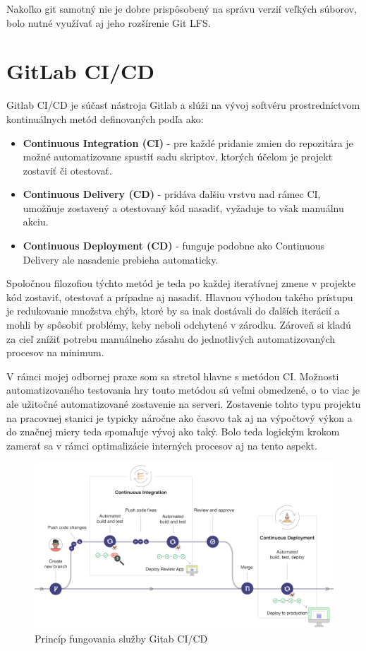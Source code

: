 \documentclass[slovak, bachelorpractice]{diploma}
\begin{document}
Nakoľko git samotný nie je dobre prispôsobený na správu verzií veľkých súborov, bolo nutné využívať aj jeho rozšírenie Git LFS. 
\section{GitLab CI/CD}
\label{sec:GitLab}
Gitlab CI/CD je súčasť nástroja Gitlab a slúži na vývoj softvéru prostredníctvom kontinuálnych metód definovaných podľa \cite{Cicd} ako:
\begin{itemize}
  \item \textbf{Continuous Integration (CI)} - pre každé pridanie zmien do repozitára je možné automatizovane spustiť sadu skriptov, ktorých účelom je projekt zostaviť či otestovať.
  \item \textbf{Continuous Delivery (CD)} - pridáva ďalšiu vrstvu nad rámec CI, umožňuje zostavený a otestovaný kód nasadiť, vyžaduje to však manuálnu akciu.
  \item \textbf{Continuous Deployment (CD)} - funguje podobne ako Continuous Delivery ale nasadenie prebieha automaticky.
\end{itemize}
Spoločnou filozofiou týchto metód je teda po každej iteratívnej zmene v projekte kód zostaviť, otestovať a prípadne aj nasadiť. Hlavnou výhodou takého prístupu je redukovanie množstva chýb, ktoré by sa inak dostávali do ďalších iterácií a mohli by spôsobiť problémy, keby neboli odchytené v zárodku. Zároveň si kladú za cieľ znížiť potrebu manuálneho zásahu do jednotlivých automatizovaných procesov na minimum.

V rámci mojej odbornej praxe som sa stretol hlavne s metódou CI. Možnosti automatizovaného testovania hry touto metódou sú veľmi obmedzené, o to viac je ale užitočné automatizované zostavenie na serveri. Zostavenie tohto typu projektu na pracovnej stanici je typicky náročne ako časovo tak aj na výpočtový výkon a do značnej miery teda spomaľuje vývoj ako taký. Bolo teda logickým krokom zamerať sa v rámci optimalizácie interných procesov aj na tento aspekt.

\begin{figure}[!htbp]
	\centering
	\includegraphics[width=.9\textwidth]{Pictures/gitlab.png}
	\vspace{-15pt}
	\caption{Princíp fungovania služby Gitab CI/CD \cite{Cicd}}
	\label{pic:Gitlab}
\end{figure}
\end{document}
